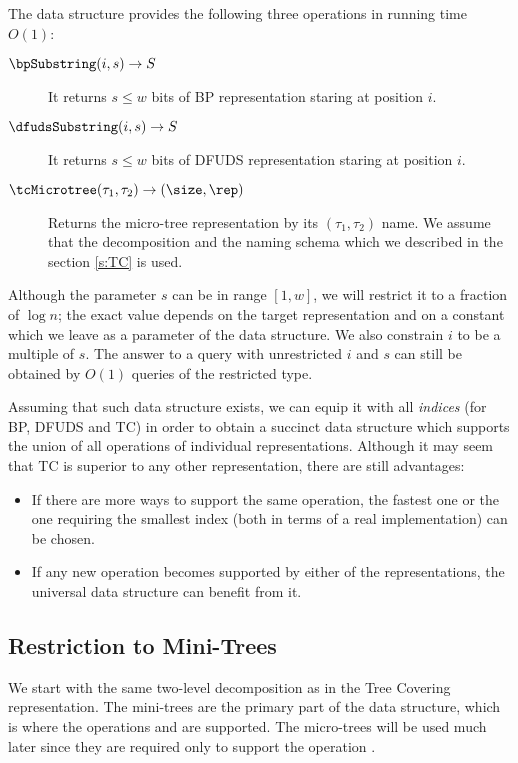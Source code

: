 The data structure provides the following three operations in running time $O(1)$:
\begin{description}
	\item[$\bpSubstring(i, s) \rightarrow S$]
	It returns $s \le w$ bits of BP representation staring at position $i$.
	
	\item[$\dfudsSubstring(i, s) \rightarrow S$] 
	It returns $s \le w$ bits of DFUDS representation staring at position $i$.
	
	\item[$\tcMicrotree(\tau_1, \tau_2) \rightarrow (\size, \rep)$]
	Returns the micro-tree representation by its $(\tau_1, \tau_2)$ name.
	We assume that the decomposition and the naming schema which we described in the section \ref{s:TC} is used.
\end{description}

Although the parameter $s$ can be in range $[1, w]$, we will restrict it to a fraction of $\log n$; the exact value depends on the target representation and on a constant which we leave as a parameter of the data structure.
We also constrain $i$ to be a multiple of $s$.
The answer to a query with unrestricted $i$ and $s$ can still be obtained by $O(1)$ queries of the restricted type.

\bigbreak

Assuming that such data structure exists, we can equip it with all \emph{indices} (for BP, DFUDS and TC) in order to obtain a succinct data structure which supports the union of all operations of individual representations.
Although it may seem that TC is superior to any other representation, there are still advantages:
\begin{itemize}
	\item If there are more ways to support the same operation, the fastest one or the one requiring the smallest index (both in terms of a real implementation) can be chosen.
	\item If any new operation becomes supported by either of the representations, the universal data structure can benefit from it.
\end{itemize}

\subsection{Restriction to Mini-Trees}

We start with the same two-level decomposition as in the Tree Covering representation.
The mini-trees are the primary part of the data structure, which is where the operations \bpSubstring{} and \dfudsSubstring{} are supported.
The micro-trees will be used much later since they are required only to support the operation \tcMicrotree{}.

